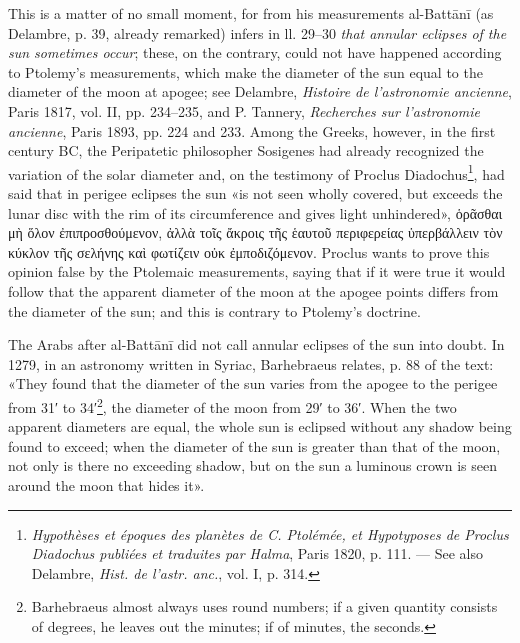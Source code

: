 \documentclass[11pt]{article}
\begin{document}
\addtocounter{footnote}{-1}
\par This is a matter of no small moment, for from his measurements al-Battānī (as Delambre, p. 39, already remarked) infers in ll. 29–30 \emph{that annular eclipses of the sun sometimes occur}; these, on the contrary, could not have happened according to Ptolemy's measurements, which make the diameter of the sun equal to the diameter of the moon at apogee; see Delambre, \emph{Histoire de l’astronomie ancienne}, Paris 1817, vol. II, pp. 234–235, and P. Tannery, \emph{Recherches sur l’astronomie ancienne}, Paris 1893, pp. 224 and 233. Among the Greeks, however, in the first century BC, the Peripatetic philosopher Sosigenes had already recognized the variation of the solar diameter and, on the testimony of Proclus Diadochus\footnote{\emph{Hypothèses et époques des planètes de C. Ptolémée, et Hypotyposes de Proclus Diadochus publiées et traduites par Halma}, Paris 1820, p. 111. — See also Delambre, \emph{Hist. de l’astr. anc.}, vol. I, p. 314.}, had said that in perigee eclipses the sun «is not seen wholly covered, but exceeds the lunar disc with the rim of its circumference and gives light unhindered», {\greekfont ὁρᾶσθαι μὴ ὅλον ἐπιπροσθούμενον, ἀλλὰ τοῖς ἄκροις τῆς ἑαυτοῦ περιφερείας ὑπερβάλλειν τὸν κύκλον τῆς σελήνης καὶ φωτίζειν οὐκ ἐμποδιζόμενον}. Proclus wants to prove this opinion false by the Ptolemaic measurements, saying that if it were true it would follow that the apparent diameter of the moon at the apogee points differs from the diameter of the sun; and this is contrary to Ptolemy's doctrine.\par
\par The Arabs after al-Battānī did not call annular eclipses of the sun into doubt. In 1279, in an astronomy written in Syriac, Barhebraeus relates, p. 88 of the text: «They found that the diameter of the sun varies from the apogee to the perigee from 31′ to 34′\footnote{Barhebraeus almost always uses round numbers; if a given quantity consists of degrees, he leaves out the minutes; if of minutes, the seconds.}, the diameter of the moon from 29′ to 36′. When the two apparent diameters are equal, the whole sun is eclipsed without any shadow being found to exceed; when the diameter of the sun is greater than that of the moon, not only is there no exceeding shadow, but on the sun a luminous crown is seen around the moon that hides it».\par
\end{document}
